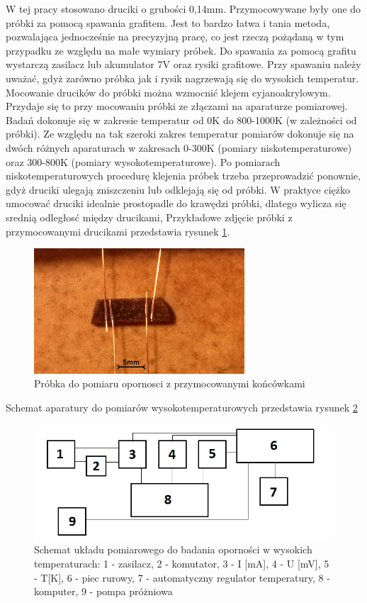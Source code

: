 \documentclass[a4paper,12pt]{article}
\numberwithin{equation}{section}
\begin{document}
 W tej pracy stosowano druciki o grubości 0,14mm. Przymocowywane były one do próbki za 
pomocą spawania grafitem. Jest to bardzo łatwa i tania metoda, pozwalająca jednocześnie na precyzyjną 
pracę, co jest rzeczą pożądaną w tym przypadku ze względu na małe wymiary próbek. Do spawania za 
pomocą grafitu wystarczą zasilacz lub akumulator 7V oraz rysiki grafitowe. Przy spawaniu należy uważać, gdyż 
zarówno próbka jak i rysik nagrzewają się do wysokich temperatur. Mocowanie drucików do próbki można 
wzmocnić klejem cyjanoakrylowym. Przydaje się to przy mocowaniu próbki ze złączami na aparaturze 
pomiarowej. Badań dokonuje się w zakresie temperatur od 0K do 800-1000K (w zależności od 
próbki). Ze względu na tak szeroki zakres temperatur pomiarów dokonuje się na dwóch różnych aparaturach w zakresach 0-300K (pomiary niskotemperaturowe) 
oraz 300-800K (pomiary wysokotemperaturowe). Po pomiarach niskotemperaturowych procedurę klejenia próbek trzeba 
przeprowadzić ponownie, gdyż druciki ulegają zniszczeniu lub odklejają się od próbki. W praktyce ciężko umocować 
druciki idealnie prostopadle do krawędzi próbki, dlatego wylicza się srednią odległosć między drucikami, Przykładowe
zdjęcie próbki z przymocowanymi drucikami przedstawia rysunek \ref{probkaOpor}.

\begin{figure}[h]
    \centering
    \includegraphics[width =0.7\textwidth]{../img/probkaOpor}
    \caption{Próbka do pomiaru opornosci z przymocowanymi końcówkami}
    \label{probkaOpor}
\end{figure}

Schemat aparatury do pomiarów wysokotemperaturowych przedstawia rysunek \ref{img:schematUkl} 

\begin{figure}[h]
    \centering
    \includegraphics[width =1.0\textwidth]{../img/schemat}
    \caption{Schemat układu pomiarowego do badania oporności w wysokich temperaturach: 1 - zasilacz, 2 - komutator, 3 -
I [mA], 4 - U [mV], 5 - T[K], 6 - piec rurowy, 7 - automatyczny regulator temperatury, 8 - komputer, 9 - pompa próżniowa}
    \label{img:schematUkl}
\end{figure}
\end{document}
